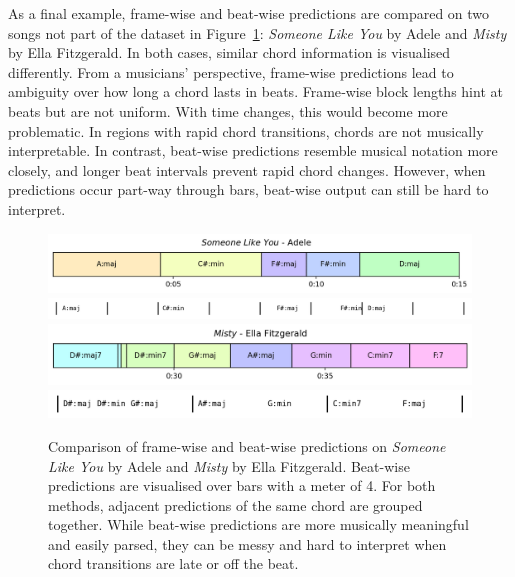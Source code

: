 As a final example, frame-wise and beat-wise predictions are compared on two songs not part of the dataset in Figure~\ref{fig:frame_vs_beat_wise}: \emph{Someone Like You} by Adele and \emph{Misty} by Ella Fitzgerald. In both cases, similar chord information is visualised differently. From a musicians' perspective, frame-wise predictions lead to ambiguity over how long a chord lasts in beats. Frame‑wise block lengths hint at beats but are not uniform. With time changes, this would become more problematic. In regions with rapid chord transitions, chords are not musically interpretable. In contrast, beat-wise predictions resemble musical notation more closely, and longer beat intervals prevent rapid chord changes. However, when predictions occur part-way through bars, beat-wise output can still be hard to interpret.

\begin{figure}[H]
    \centering
    \includegraphics[width=1.0\textwidth]{figures/someone_like_you_chord.png}
    \includegraphics[width=1.0\textwidth]{figures/someone_like_you_chord_chart.png}\\
    \vspace{0.2cm}
    \includegraphics[width=1.0\textwidth]{figures/misty_chord_plot.png}
    \includegraphics[width=1.0\textwidth]{figures/misty_chord_chart.png}
    \caption{Comparison of frame-wise and beat-wise predictions on \emph{Someone Like You} by Adele and \emph{Misty} by Ella Fitzgerald. Beat-wise predictions are visualised over bars with a meter of 4. For both methods, adjacent predictions of the same chord are grouped together. While beat-wise predictions are more musically meaningful and easily parsed, they can be messy and hard to interpret when chord transitions are late or off the beat.}\label{fig:frame_vs_beat_wise}
\end{figure}